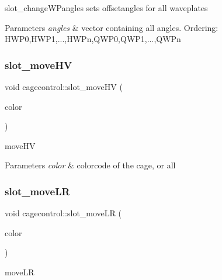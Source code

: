 slot\+\_\+change\+W\+Pangles sets offsetangles for all waveplates 


\begin{DoxyParams}{Parameters}
{\em angles} & vector containing all angles. Ordering\+: H\+W\+P0,H\+W\+P1,...,H\+W\+Pn,Q\+W\+P0,Q\+W\+P1,...,Q\+W\+Pn \\
\hline
\end{DoxyParams}
\mbox{\label{classcagecontrol_af9a2772a38394159c54d7e5d7f2a86fb}} 
\subsubsection{\texorpdfstring{slot\+\_\+move\+HV}{slot\_moveHV}}
{\footnotesize\ttfamily void cagecontrol\+::slot\+\_\+move\+HV (\begin{DoxyParamCaption}\item[{Q\+String}]{color }\end{DoxyParamCaption})\hspace{0.3cm}{\ttfamily [slot]}}



move\+HV 


\begin{DoxyParams}{Parameters}
{\em color} & colorcode of the cage, or \textquotesingle{}all\textquotesingle{} \\
\hline
\end{DoxyParams}
\mbox{\label{classcagecontrol_a138905383fdc09a0b5077a185eaf6682}} 
\subsubsection{\texorpdfstring{slot\+\_\+move\+LR}{slot\_moveLR}}
{\footnotesize\ttfamily void cagecontrol\+::slot\+\_\+move\+LR (\begin{DoxyParamCaption}\item[{Q\+String}]{color }\end{DoxyParamCaption})\hspace{0.3cm}{\ttfamily [slot]}}



move\+LR 


